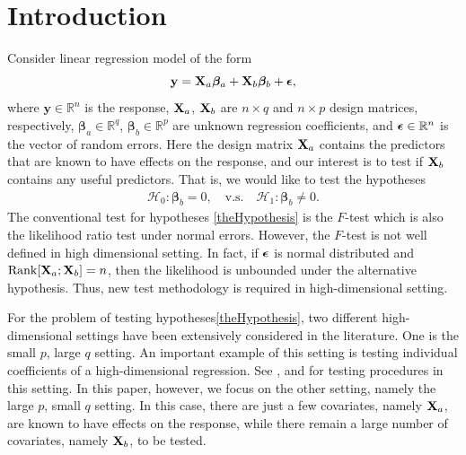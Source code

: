 \documentclass[11pt]{article}
\DeclareMathOperator{\myRank}{Rank}
\newcommand{\By}{\mathbf{y}}    \newcommand{\Bz}{\mathbf{z}}
\newcommand{\bfsym}[1]{\ensuremath{\boldsymbol{#1}}}
\def\bbeta{\bfsym \beta}
\theoremstyle{plain}
\theoremstyle{definition}
\theoremstyle{remark}
\begin{document}
\section{Introduction} 
Consider linear regression model of the form
\begin{equation}\label{label:linearModel}
    \By = 
    \BX_a \bbeta_a + \BX_b \bbeta_b + \bepsilon, %
\end{equation}
where $\By \in \mathbb R^n$ is the response, $\mathbf{X}_a$, $\mathbf{X}_b$ are $n\times q$ and $n\times p$ design matrices, respectively,  $\bbeta_a\in \mathbb R^q$, $\bbeta_b\in \mathbb R^p$ are unknown regression coefficients, and 
$\bepsilon\in \mathbb R^n$ is the vector of random errors.
Here the design matrix $\mathbf{X}_a$ contains the predictors that are known to have effects on the response,
and our interest is to test if $\mathbf{X}_b$ contains any useful predictors.
That is, we would like to test the hypotheses
\begin{align}\label{theHypothesis}
    \mathcal H_0:   \bbeta_b =0,\quad
    \text{v.s.} \quad
    \mathcal H_1:   \bbeta_b \neq 0.
\end{align}
The conventional test for hypotheses \eqref{theHypothesis} is the $F$-test which is also the likelihood ratio test under normal errors.
However, the $F$-test is not well defined in high dimensional setting.
In fact, if $\bepsilon$ is normal distributed and $\myRank[\BX_a;\BX_b]=n$, then the likelihood is unbounded under the alternative hypothesis.
Thus, new test methodology is required in high-dimensional setting.

For the problem of testing hypotheses\eqref{theHypothesis}, two different high-dimensional settings have been extensively considered in the literature.
One is the small $p$, large $q$ setting.
An important example of this setting is testing individual coefficients of a high-dimensional regression.
See \cite{buhlmann2013statistical}, \cite{Zhang2013} and \cite{Lan2016} for testing procedures in this setting.
In this paper, however, we focus on the other setting, namely the large $p$, small $q$ setting.
In this case, there are just a few covariates, namely $\mathbf{X}_a$, are known to have effects on the response, while there remain a large number of covariates, namely $\mathbf{X}_b$, to be tested.
\end{document}
